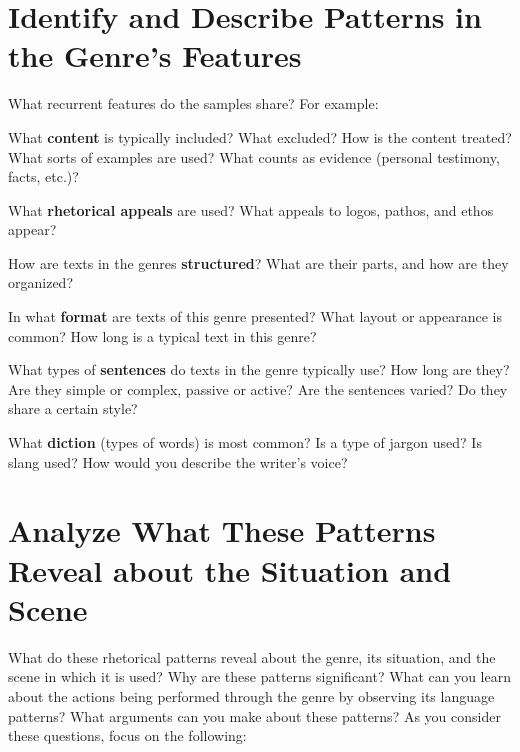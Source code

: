 \documentclass[10pt,article,oneside,twocolumn]{memoir}
\begin{document}
\section{Identify and Describe Patterns in the Genre’s Features} %
\label{sub:identify_and_describe_patterns_in_the_genre_s_features}
What recurrent features do the samples share? For example: 
\begin{compactitem}
	\item What \textbf{content} is typically included? What excluded? How is the content treated? What sorts of examples are used? What counts as evidence (personal testimony, facts, etc.)?
	\item What \textbf{rhetorical appeals} are used? What appeals to logos, pathos, and ethos appear? 
	\item How are texts in the genres \textbf{structured}? What are their parts, and how are they organized? 
	\item In what \textbf{format} are texts of this genre presented? What layout or appearance is common? How long is a typical text in this genre? 
	\item What types of \textbf{sentences} do texts in the genre typically use? How long are they? Are they simple or complex, passive or active? Are the sentences varied? Do they share a certain style? 
	\item What \textbf{diction} (types of words) is most common? Is a type of jargon used? Is slang used? How would you describe the writer’s voice?

\end{compactitem}

\section{Analyze What These Patterns Reveal about the Situation and Scene} %
\label{sub:analyze_what_these_patterns_reveal_about_the_situation_and_scene}
What do these rhetorical patterns reveal about the genre, its situation, and the scene in which it is used? Why are these patterns significant? What can you learn about the actions being performed through the genre by observing its language patterns? What arguments can you make about these patterns? As you consider these questions, focus on the following:
\end{document}
